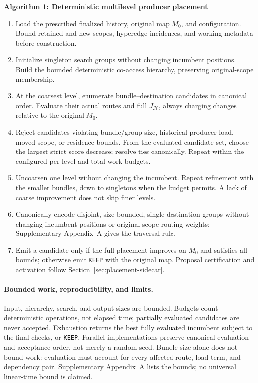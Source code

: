 \begin{center}
\begin{minipage}{0.96\linewidth}
\small
\textbf{Algorithm 1: Deterministic multilevel producer placement}
\begin{enumerate}[label=\arabic*.,leftmargin=1.8em]
\item Load the prescribed finalized history, original map \(M_0\), and configuration. Bound retained and new scopes, hyperedge incidences, and working metadata before construction.
\item Initialize singleton search groups without changing incumbent positions. Build the bounded deterministic co-access hierarchy, preserving original-scope membership.
\item At the coarsest level, enumerate bundle--destination candidates in canonical order. Evaluate their actual routes and full \(J_{\mathcal H}\), always charging changes relative to the original \(M_0\).
\item Reject candidates violating bundle/group-size, historical producer-load, moved-scope, or residence bounds. From the evaluated candidate set, choose the largest strict score decrease; resolve ties canonically. Repeat within the configured per-level and total work budgets.
\item Uncoarsen one level without changing the incumbent. Repeat refinement with the smaller bundles, down to singletons when the budget permits. A lack of coarse improvement does not skip finer levels.
\item Canonically encode disjoint, size-bounded, single-destination groups without changing incumbent positions or original-scope routing weights; Supplementary Appendix~A gives the traversal rule.
\item Emit a candidate only if the full placement improves on \(M_0\) and satisfies all bounds; otherwise emit \texttt{KEEP} with the original map. Proposal certification and activation follow Section~\ref{sec:placement-sidecar}.
\end{enumerate}
\end{minipage}
\end{center}

\paragraph{Bounded work, reproducibility, and limits.}
Input, hierarchy, search, and output sizes are bounded. Budgets count deterministic operations, not elapsed time; partially evaluated candidates are never accepted. Exhaustion returns the best fully evaluated incumbent subject to the final checks, or \texttt{KEEP}. Parallel implementations preserve canonical evaluation and acceptance order, not merely a random seed. Bundle size alone does not bound work: evaluation must account for every affected route, load term, and dependency pair. Supplementary Appendix~A lists the bounds; no universal linear-time bound is claimed.

